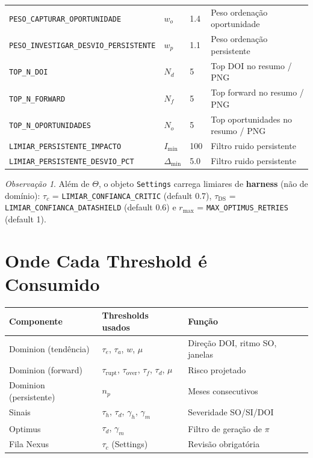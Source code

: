 \documentclass[a4paper, 12pt]{report}
\theoremstyle{definition}
\theoremstyle{remark}
\newtheorem{observacao}{Observa\c{c}\~ao}[chapter]
\begin{document}
\begin{center}
\begin{tabular}{llp{1.8cm}p{4.2cm}}
  \texttt{PESO\_CAPTURAR\_OPORTUNIDADE} & $w_o$ & 1.4 & Peso ordena\c{c}\~ao oportunidade \\
  \texttt{PESO\_INVESTIGAR\_DESVIO\_PERSISTENTE} & $w_p$ & 1.1 & Peso ordena\c{c}\~ao persistente \\
  \texttt{TOP\_N\_DOI} & $N_d$ & 5 & Top DOI no resumo / PNG \\
  \texttt{TOP\_N\_FORWARD} & $N_f$ & 5 & Top forward no resumo / PNG \\
  \texttt{TOP\_N\_OPORTUNIDADES} & $N_o$ & 5 & Top oportunidades no resumo / PNG \\
  \texttt{LIMIAR\_PERSISTENTE\_IMPACTO} & $I_{\min}$ & 100 & Filtro ruido persistente \\
  \texttt{LIMIAR\_PERSISTENTE\_DESVIO\_PCT} & $\Delta_{\min}$ & 5.0 & Filtro ruido persistente \\
  \bottomrule
\end{tabular}
\end{center}

\begin{observacao}
  Al\'em de $\Theta$, o objeto \texttt{Settings} carrega limiares de
  \textbf{harness} (n\~ao de dom\'inio): $\tau_c$ =
  \texttt{LIMIAR\_CONFIANCA\_CRITIC} (default 0.7),
  $\tau_{\text{DS}}$ = \texttt{LIMIAR\_CONFIANCA\_DATASHIELD} (default 0.6)
  e $r_{\max}$ = \texttt{MAX\_OPTIMUS\_RETRIES} (default 1).
\end{observacao}


\section{Onde Cada Threshold \'e Consumido}

\begin{center}
\begin{tabular}{lll}
  \toprule
  \textbf{Componente} & \textbf{Thresholds usados} & \textbf{Fun\c{c}\~ao} \\
  \midrule
  Dominion (tend\^encia) & $\tau_e$, $\tau_a$, $w$, $\mu$ & Dire\c{c}\~ao DOI, ritmo SO, janelas \\
  Dominion (forward) & $\tau_{\text{rupt}}$, $\tau_{\text{over}}$, $\tau_f$, $\tau_d$, $\mu$ & Risco projetado \\
  Dominion (persistente) & $n_p$ & Meses consecutivos \\
  Sinais & $\tau_h$, $\tau_d$, $\gamma_h$, $\gamma_m$ & Severidade SO/SI/DOI \\
  Optimus & $\tau_d$, $\gamma_m$ & Filtro de gera\c{c}\~ao de $\pi$ \\
  Fila Nexus & $\tau_c$ (Settings) & Revis\~ao obrigat\'oria \\
  \bottomrule
\end{tabular}
\end{center}
\end{document}
